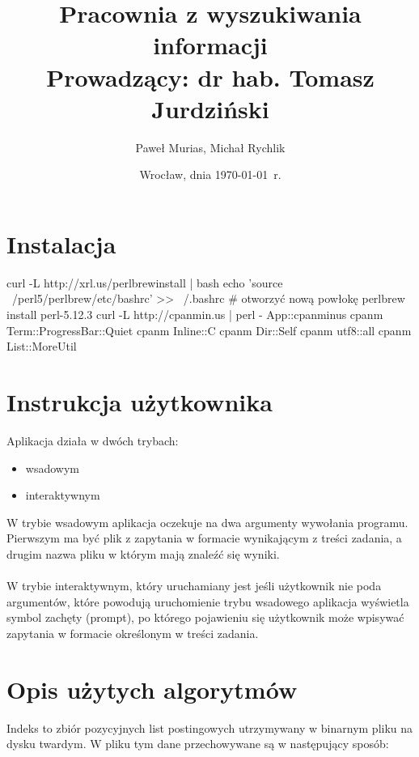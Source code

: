 \documentclass[11pt,leqno]{article}
\title{{\textbf{Pracownia z wyszukiwania informacji}}\\[1ex]
       {\large Prowadzący: dr hab. Tomasz Jurdziński}}
\author{Paweł Murias, Michał Rychlik}
\date{Wrocław, dnia \today\ r.}
\begin{document}
\thispagestyle{empty}
\maketitle

\section{Instalacja}

curl -L http://xrl.us/perlbrewinstall | bash
echo 'source ~/perl5/perlbrew/etc/bashrc' >> ~/.bashrc
# otworzyć nową powłokę
perlbrew install perl-5.12.3
curl -L http://cpanmin.us | perl - App::cpanminus
cpanm Term::ProgressBar::Quiet
cpanm Inline::C
cpanm Dir::Self
cpanm utf8::all
cpanm List::MoreUtil

\section{Instrukcja użytkownika}

Aplikacja działa w dwóch trybach:

\begin{itemize}
\item wsadowym
\item interaktywnym
\end{itemize}

W trybie wsadowym aplikacja oczekuje na dwa argumenty wywołania programu. Pierwszym ma być plik z zapytania w formacie wynikającym z treści zadania, a drugim nazwa pliku w którym mają znaleźć się wyniki.\\\\
W trybie interaktywnym, który uruchamiany jest jeśli użytkownik nie poda argumentów, które powodują uruchomienie trybu wsadowego aplikacja wyświetla symbol zachęty (prompt), po którego pojawieniu się użytkownik może wpisywać zapytania w formacie określonym w treści zadania.

\section{Opis użytych algorytmów}

Indeks to zbiór pozycyjnych list postingowych utrzymywany w binarnym pliku na dysku twardym. W pliku tym dane przechowywane są w następujący sposób:
\end{document}
